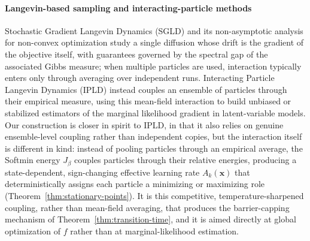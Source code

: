 \documentclass{article}
\theoremstyle{plain}
\theoremstyle{definition}
\theoremstyle{remark}
\newcommand{\prefactor}[2]{A_{#1}(#2)}
\newcommand{\xx}{\mathbf{x}}
\begin{document}
\paragraph{Langevin-based sampling and interacting-particle methods}
Stochastic Gradient Langevin Dynamics (SGLD) \cite{welling2011bayesian} and its non-asymptotic analysis for non-convex optimization \cite{raginsky2017nonconvex} study a single diffusion whose drift is the gradient of the objective itself, with guarantees governed by the spectral gap of the associated Gibbs measure; when multiple particles are used, interaction typically enters only through averaging over independent runs. Interacting Particle Langevin Dynamics (IPLD) \cite{akyildiz2025interacting, encinar2025proximal} instead couples an ensemble of particles through their empirical measure, using this mean-field interaction to build unbiased or stabilized estimators of the marginal likelihood gradient in latent-variable models. Our construction is closer in spirit to IPLD, in that it also relies on genuine ensemble-level coupling rather than independent copies, but the interaction itself is different in kind: instead of pooling particles through an empirical average, the Softmin energy $J_\beta$ couples particles through their relative energies, producing a state-dependent, sign-changing effective learning rate $\prefactor{k}{\xx}$ that deterministically assigns each particle a minimizing or maximizing role (Theorem~\ref{thm:stationary-points}). It is this competitive, temperature-sharpened coupling, rather than mean-field averaging, that produces the barrier-capping mechanism of Theorem~\ref{thm:transition-time}, and it is aimed directly at global optimization of $f$ rather than at marginal-likelihood estimation.
\end{document}
